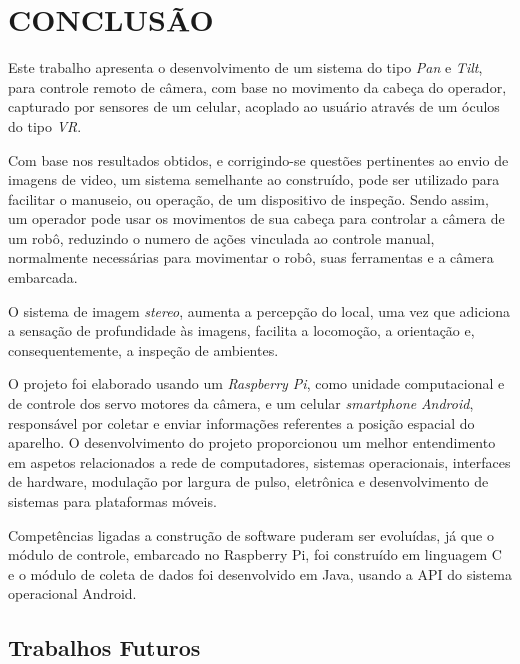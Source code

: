 
\chapter{CONCLUSÃO}
\label{chap:conclusao}

Este trabalho apresenta o desenvolvimento de um sistema do tipo \textit{Pan} e \textit{Tilt}, para controle remoto de câmera, com base no movimento da cabeça do operador, capturado por sensores de um celular, acoplado ao usuário através de um óculos do tipo \textit{VR}.\par
Com base nos resultados obtidos, e corrigindo-se questões pertinentes ao envio de imagens de video, um sistema semelhante ao construído, pode ser utilizado para facilitar o manuseio, ou operação, de um dispositivo de inspeção. Sendo assim, um operador pode usar os movimentos de sua cabeça para controlar a câmera de um robô, reduzindo o numero de ações vinculada ao controle manual, normalmente necessárias para movimentar o robô, suas ferramentas e a câmera embarcada. \par 
O sistema de imagem \textit{stereo}, aumenta a percepção do local, uma vez que adiciona a sensação de profundidade às imagens, facilita a locomoção, a orientação e, consequentemente, a inspeção de ambientes.

O projeto foi elaborado usando um \textit{Raspberry Pi}, como unidade computacional e de controle dos servo motores da câmera, e um celular \textit{smartphone} \textit{Android}, responsável por coletar e enviar informações referentes a posição espacial do aparelho. O desenvolvimento do projeto proporcionou um melhor entendimento em aspetos relacionados a rede de computadores, sistemas operacionais, interfaces de hardware, modulação por largura de pulso, eletrônica e desenvolvimento de sistemas para plataformas móveis.\par

Competências ligadas a construção de software puderam ser evoluídas, já que o módulo de controle, embarcado no Raspberry Pi, foi construído em linguagem C e o módulo de coleta de dados foi desenvolvido em Java, usando a API do sistema operacional Android.\par

\section{Trabalhos Futuros}
\label{sec:trabalhosFuturos}

